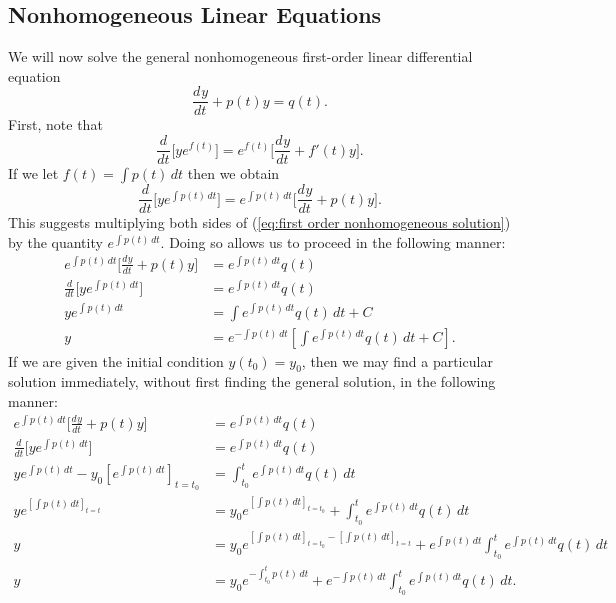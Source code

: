 \documentclass{myart}
\newcommand{\eq}[1]{(\ref{eq:#1})}
\newcommand{\deriv}[3][]{\frac{d^{#1}#2}{d#3^{#1}}}
\begin{document}
\subsection{Nonhomogeneous Linear Equations}
\label{subsec:first order nonhomogeneous}

We will now solve the general nonhomogeneous first-order linear
differential equation
\begin{equation} \label{eq:first order nonhomogeneous solution}
  \deriv{y}{t} + p(t)y = q(t).
\end{equation}
First, note that
\begin{equation*}
  \deriv{}{t}\Big[ye^{f(t)}\Big] = e^{f(t)}\Big[\deriv{y}{t} + f'(t)y\Big].
\end{equation*}
If we let $f(t) = \int p(t) \,dt$ then we obtain
\begin{equation*}
  \deriv{}{t}\Big[ye^{\int p(t) \,dt}\Big]
  = e^{\int p(t) \,dt}\Big[\deriv{y}{t} + p(t)y\Big].
\end{equation*}
This suggests multiplying both sides of \eq{first order nonhomogeneous
  solution} by the quantity $e^{\int p(t) \,dt}$. Doing so allows us
to proceed in the following manner:
\begin{align*}
     e^{\int p(t) \,dt}\Big[\deriv{y}{t} + p(t)y\Big]
  &= e^{\int p(t) \,dt} q(t) \\
     \deriv{}{t} \Big[ye^{\int p(t) \,dt}\Big]
  &= e^{\int p(t) \,dt} q(t) \\
     ye^{\int p(t) \,dt}
  &= \int e^{\int p(t) \,dt} q(t) \,dt + C \\
     y
  &= e^{-\int p(t) \,dt}
     \left[\int e^{\int p(t) \,dt} q(t) \,dt + C\right].
\end{align*}
If we are given the initial condition $y(t_0) = y_0$, then we may find
a particular solution immediately, without first finding the general
solution, in the following manner:
\begin{align*}
  e^{\int p(t) \,dt}\Big[\deriv{y}{t} + p(t)y\Big]
  &= e^{\int p(t) \,dt} q(t) \\
  \deriv{}{t} \Big[ye^{\int p(t) \,dt}\Big]
  &= e^{\int p(t) \,dt} q(t) \\
  ye^{\int p(t) \,dt} - y_0\left[e^{\int p(t) \,dt}\right]_{t=t_0}
  &= \int_{t_0}^t e^{\int p(t) \,dt} q(t) \,dt \\
  ye^{\left[\int p(t) \,dt\right]_{t=t}}
  &= y_0e^{\left[\int p(t) \,dt\right]_{t=t_0}}
    + \int_{t_0}^t e^{\int p(t) \,dt} q(t) \,dt \\
  y &= y_0e^{\left[\int p(t) \,dt\right]_{t=t_0}
      - \left[\int p(t) \,dt\right]_{t=t}}
      + e^{\int p(t) \,dt} \int_{t_0}^t e^{\int p(t) \,dt} q(t) \,dt \\
  y &= y_0e^{-\int_{t_0}^t p(t) \,dt}
      + e^{-\int p(t) \,dt} \int_{t_0}^t e^{\int p(t) \,dt} q(t) \,dt.
\end{align*}
\end{document}
